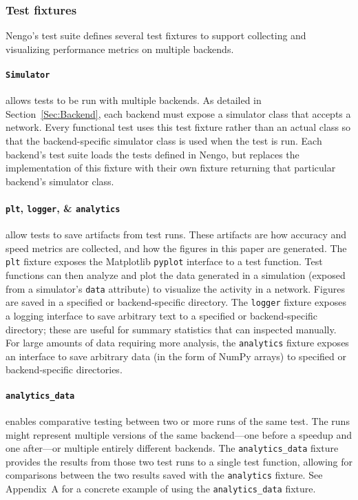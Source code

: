 \documentclass{frontiersSCNS}
\begin{document}
\subsubsection{Test fixtures}

Nengo's test suite defines several test fixtures
to support collecting and visualizing performance metrics
on multiple backends.

\paragraph{\texttt{Simulator}}
allows tests to be run with multiple backends.
As detailed in Section~\ref{Sec:Backend},
each backend must expose a simulator class
that accepts a network.
Every functional test uses this test fixture rather than
an actual class so that
the backend-specific simulator class is used
when the test is run.
Each backend's test suite loads
the tests defined in Nengo,
but replaces the implementation of
this fixture with their own fixture
returning that particular backend's simulator class.

\paragraph{\texttt{plt}, \texttt{logger}, \& \texttt{analytics}}
allow tests to save artifacts from test runs.
These artifacts are how accuracy and speed metrics
are collected, and how the figures
in this paper are generated.
The \texttt{plt} fixture exposes the Matplotlib \citep{hunter2007}
\texttt{pyplot} interface to a test function.
Test functions can then analyze and plot
the data generated in a simulation
(exposed from a simulator's \texttt{data} attribute)
to visualize the activity in a network.
Figures are saved in a specified or backend-specific directory.
The \texttt{logger} fixture exposes a logging interface
to save arbitrary text to a specified
or backend-specific directory;
these are useful for summary statistics
that can inspected manually.
For large amounts of data
requiring more analysis,
the \texttt{analytics} fixture exposes an interface
to save arbitrary data (in the form of NumPy arrays)
to specified or backend-specific directories.

\paragraph{\texttt{analytics\_data}}
enables comparative testing between
two or more runs of the same test.
The runs might represent multiple versions
of the same backend---one before a
speedup and one after---or multiple
entirely different backends.
The \texttt{analytics\_data} fixture
provides the results from those two
test runs to a single test function,
allowing for comparisons
between the two results saved
with the \texttt{analytics} fixture.
See Appendix~A for a
concrete example of using the
\texttt{analytics\_data} fixture.
\end{document}
